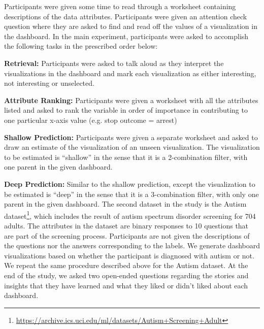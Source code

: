 \par Participants were given some time to read through a worksheet containing descriptions of the data attributes. Participants were given an attention check question where they are asked to find and read off the values of a visualization in the dashboard. In the main experiment, participants were asked to accomplish the following tasks in the prescribed order below:
\par \textbf{Retrieval:} Participants were asked to talk aloud as they interpret the visualizations in the dashboard and mark each visualization as either interesting, not interesting or unselected.
\par \textbf{Attribute Ranking:} Participants were given a worksheet with all the attributes listed and asked to rank the variable in order of importance in contributing to one particular x-axis value (e.g. stop outcome = arrest)
\par \textbf{Shallow Prediction:} Participants were given a separate worksheet and asked to draw an estimate of the visualization of an unseen visualization. The visualization to be estimated is ``shallow'' in the sense that it is a 2-combination filter, with one parent in the given dashboard. 
\par \textbf{Deep Prediction:} Similar to the shallow prediction, except the visualization to be estimated is ``deep'' in the sense that it is a 3-combination filter, with only one parent in the given dashboard. 
The second dataset in the study is the Autism dataset\footnote{\url{https://archive.ics.uci.edu/ml/datasets/Autism+Screening+Adult}}, which includes the result of autism spectrum disorder screening for 704 adults. The attributes in the dataset are  binary responses to 10 questions that are part of the screening process. Participants are not given the descriptions of the questions nor the answers corresponding to the labels. We generate dashboard visualizations based on whether the participant is diagnosed with autism or not. We repeat the same procedure described above for the Autism dataset. At the end of the study, we asked two open-ended questions regarding the stories and insights that they have learned and what they liked or didn't liked about each dashboard.
